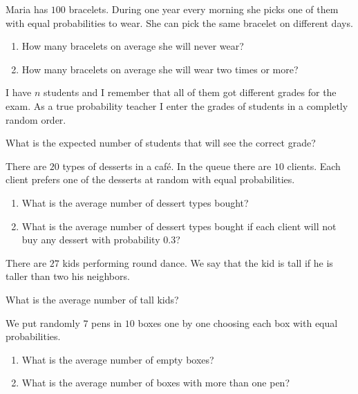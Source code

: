 \documentclass[12pt]{article}
\begin{document}
\begin{exercise}
Maria has $100$ bracelets.
During one year every morning she picks one of them with equal probabilities to wear. 
She can pick the same bracelet on different days.

\begin{enumerate}[label=\alph*)]
\item How many bracelets on average she will never wear?
\item How many bracelets on average she will wear two times or more?
\end{enumerate}
\end{exercise}


\begin{exercise}
I have $n$ students and I remember that all of them got different grades for the exam.
As a true probability teacher I enter the grades of students in a completly random order. 

What is the expected number of students that will see the correct grade?
\end{exercise}

\begin{exercise}
There are $20$ types of desserts in a café. In the queue there are $10$ clients.
Each client prefers one of the desserts at random with equal probabilities.

\begin{enumerate}[label=\alph*)]
  \item What is the average number of dessert types bought?
  \item What is the average number of dessert types bought if each client will not buy any dessert with probability $0.3$?
\end{enumerate}
 
\end{exercise}

\begin{exercise}
There are $27$ kids performing round dance.
We say that the kid is tall if he is taller than two his neighbors.

What is the average number of tall kids?
\end{exercise}

\begin{exercise}
We put randomly $7$ pens in $10$ boxes one by one choosing each box with equal probabilities.
\begin{enumerate}[label=\alph*)]
  \item What is the average number of empty boxes?
  \item What is the average number of boxes with more than one pen?
\end{enumerate}
\end{exercise}
\end{document}
